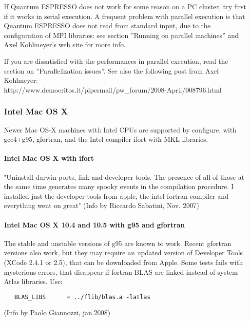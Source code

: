 \documentclass[12pt,a4paper]{article}
\begin{document}
If Quantum ESPRESSO does not work for some reason on a PC cluster,
try first if it works in serial execution. A frequent problem with parallel
execution is that Quantum ESPRESSO does not read from standard input,
due to the configuration of MPI libraries: see section 
''Running on parallel machines'' and Axel Kohlmeyer's web site for
more info. 

If you are dissatisﬁed with the performances in parallel execution,
read the section on ''Parallelization issues''. See also the following
post from Axel Kohlmeyer:\\
http://www.democritos.it/pipermail/pw\_forum/2008-April/008796.html

\subsubsection{Intel Mac OS X}

Newer Mac OS-X machines with Intel CPUs are supported by configure,
with gcc4+g95, gfortran, and the Intel compiler ifort with MKL libraries.

\paragraph{Intel Mac OS X with ifort}

"Uninstall darwin ports, fink and developer tools. The presence of all of
those at the same time generates many spooky events in the compilation
procedure.  I installed just the developer tools from apple, the intel
fortran compiler and everything went on great" (Info by Riccardo Sabatini, 
Nov. 2007)

\paragraph{Intel Mac OS X 10.4 and 10.5 with g95 and gfortran}

The stable and unstable versions of g95 are known to work. Recent
gfortran versions also work, but they may require an updated version
of Developer Tools (XCode 2.4.1 or 2.5), that can be downloaded from
Apple. Some tests fails with mysterious errors, that disappear if
fortran BLAS are linked instead of system Atlas libraries. Use: 
\begin{verbatim}
   BLAS_LIBS      = ../flib/blas.a -latlas
\end{verbatim}
(Info by Paolo Giannozzi, jan.2008)
\end{document}
